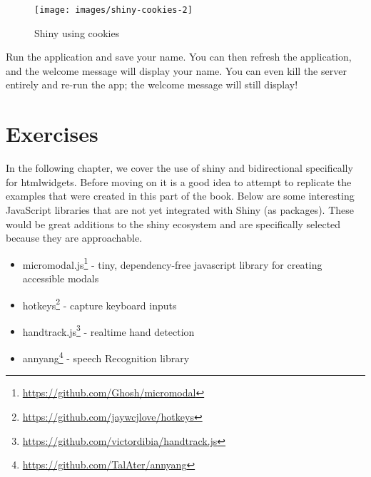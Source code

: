 \documentclass[10pt,]{krantz}
\makeatletter
\newenvironment{Shaded}{\begin{snugshade}}{\end{snugshade}}
\newcommand{\CommentTok}[1]{\textcolor[rgb]{0.37,0.37,0.37}{\textit{#1}}}
\newcommand{\ControlFlowTok}[1]{\textcolor[rgb]{0.27,0.27,0.27}{\textbf{#1}}}
\newcommand{\KeywordTok}[1]{\textcolor[rgb]{0.27,0.27,0.27}{\textbf{#1}}}
\newcommand{\NormalTok}[1]{#1}
\newcommand{\OperatorTok}[1]{\textcolor[rgb]{0.43,0.43,0.43}{\textbf{#1}}}
\newcommand{\StringTok}[1]{\textcolor[rgb]{0.5,0.5,0.5}{#1}}
\providecommand{\tightlist}{%
  \setlength{\itemsep}{0pt}\setlength{\parskip}{0pt}}
\renewcommand{\href}[2]{#2\footnote{\url{#1}}}
\newenvironment{kframe}{%
\medskip{}
\setlength{\fboxsep}{.8em}
 \def\at@end@of@kframe{}%
 \ifinner\ifhmode%
  \def\at@end@of@kframe{\end{minipage}}%
  \begin{minipage}{\columnwidth}%
 \fi\fi%
 \def\FrameCommand##1{\hskip\@totalleftmargin \hskip-\fboxsep
 \colorbox{shadecolor}{##1}\hskip-\fboxsep
     \hskip-\linewidth \hskip-\@totalleftmargin \hskip\columnwidth}%
 \MakeFramed {\advance\hsize-\width
   \@totalleftmargin\z@ \linewidth\hsize
   \@setminipage}}%
 {\par\unskip\endMakeFramed%
 \at@end@of@kframe}
\renewenvironment{Shaded}{\begin{kframe}}{\end{kframe}}
\makeatother
\begin{document}
\begin{Shaded}
\end{Shaded}

\begin{figure}[H]

{\centering \texttt{[image: images/shiny-cookies-2]} 

}

\caption{Shiny using cookies}\label{fig:shiny-cookies}
\end{figure}

Run the application and save your name. You can then refresh the application, and the welcome message will display your name. You can even kill the server entirely and re-run the app; the welcome message will still display!

\hypertarget{shiny-cookies-exercises}{%
\section{Exercises}\label{shiny-cookies-exercises}}

In the following chapter, we cover the use of shiny and bidirectional specifically for htmlwidgets. Before moving on it is a good idea to attempt to replicate the examples that were created in this part of the book. Below are some interesting JavaScript libraries that are not yet integrated with Shiny (as packages). These would be great additions to the shiny ecosystem and are specifically selected because they are approachable.

\begin{itemize}
\tightlist
\item
  \href{https://github.com/Ghosh/micromodal}{micromodal.js} - tiny, dependency-free javascript library for creating accessible modals
\item
  \href{https://github.com/jaywcjlove/hotkeys}{hotkeys} - capture keyboard inputs
\item
  \href{https://github.com/victordibia/handtrack.js}{handtrack.js} - realtime hand detection
\item
  \href{https://github.com/TalAter/annyang}{annyang} - speech Recognition library
\end{itemize}
\end{document}
